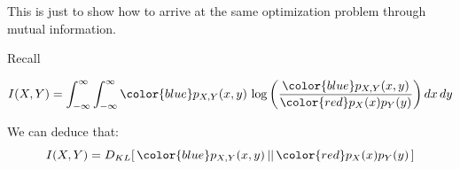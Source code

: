 \begin{frame}{\subsecname}



This is just to show how to arrive at the same optimization problem through mutual information.

Recall

\begin{equation*}
I(X,Y) = \int_{-\infty}^{\infty} \int_{-\infty}^{\infty} {\color{blue}p_{X,Y}(x,y)} \, \log \left(\frac{{\color{blue}p_{X,Y}(x,y)}}{{\color{red}p_X(x) p_Y(y)}}\right) dx \, dy
\end{equation*}



\pause

We can deduce that:
\begin{equation}
I(X,Y) = D_{KL} \lbrack \, {\color{blue}p_{X,Y}(x,y)} \, || \, {\color{red}p_X(x) p_Y(y)} \, \rbrack
\end{equation}

\end{frame}

